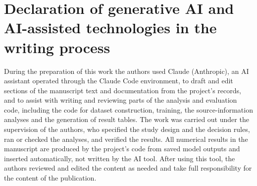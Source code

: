 \section*{Declaration of generative AI and AI-assisted technologies in the writing process}

During the preparation of this work the authors used Claude (Anthropic), an AI assistant operated through the Claude Code environment, to draft and edit sections of the manuscript text and documentation from the project's records, and to assist with writing and reviewing parts of the analysis and evaluation code, including the code for dataset construction, training, the source-information analyses and the generation of result tables. The work was carried out under the supervision of the authors, who specified the study design and the decision rules, ran or checked the analyses, and verified the results. All numerical results in the manuscript are produced by the project's code from saved model outputs and inserted automatically, not written by the AI tool. After using this tool, the authors reviewed and edited the content as needed and take full responsibility for the content of the publication.
